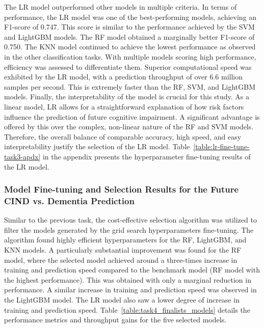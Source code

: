 The LR model outperformed other models in multiple criteria. In terms of performance, the LR model was one of the best-performing models, achieving an F1-score of 0.747. This score is similar to the performance achieved by the SVM and LightGBM models. The RF model obtained a marginally better F1-score of 0.750. The KNN model continued to achieve the lowest performance as observed in the other classification tasks. With multiple models scoring high performance, efficiency was assessed to differentiate them. Superior computational speed was exhibited by the LR model, with a prediction throughput of over 6.6 million samples per second. This is extremely faster than the RF, SVM, and LightGBM models. Finally, the interpretability of the model is crucial for this study. As a linear model, LR allows for a straightforward explanation of how risk factors influence the prediction of future cognitive impairment. A significant advantage is offered by this over the complex, non-linear nature of the RF and SVM models. Therefore, the overall balance of comparable accuracy, high speed, and easy interpretability justify the selection of the LR model. Table~\ref{table:lr-fine-tune-task3-apdx} in the appendix presents the hyperparameter fine-tuning results of the LR model.

\subsubsection{Model Fine-tuning and Selection Results for the Future CIND vs. Dementia Prediction}
Similar to the previous task, the cost-effective selection algorithm was utilized to filter the models generated by the grid search hyperparameters fine-tuning. The algorithm found highly efficient hyperparameters for the RF, LightGBM, and KNN models. A particularly substantial improvement was found for the RF model, where the selected model achieved around a three-times increase in training and prediction speed compared to the benchmark model (RF model with the highest performance). This was obtained with only a marginal reduction in performance. A similar increase in training and prediction speed was observed in the LightGBM model. The LR model also saw a lower degree of increase in training and prediction speed. Table~\ref{table:task4_finalists_models} details the performance metrics and throughput gains for the five selected models.

